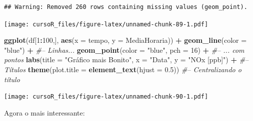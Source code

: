 \documentclass[]{book}
\newenvironment{Shaded}{\begin{snugshade}}{\end{snugshade}}
\newcommand{\KeywordTok}[1]{\textcolor[rgb]{0.13,0.29,0.53}{\textbf{#1}}}
\newcommand{\DataTypeTok}[1]{\textcolor[rgb]{0.13,0.29,0.53}{#1}}
\newcommand{\DecValTok}[1]{\textcolor[rgb]{0.00,0.00,0.81}{#1}}
\newcommand{\FloatTok}[1]{\textcolor[rgb]{0.00,0.00,0.81}{#1}}
\newcommand{\StringTok}[1]{\textcolor[rgb]{0.31,0.60,0.02}{#1}}
\newcommand{\CommentTok}[1]{\textcolor[rgb]{0.56,0.35,0.01}{\textit{#1}}}
\newcommand{\OperatorTok}[1]{\textcolor[rgb]{0.81,0.36,0.00}{\textbf{#1}}}
\newcommand{\NormalTok}[1]{#1}
\theoremstyle{definition}
\theoremstyle{definition}
\theoremstyle{definition}
\theoremstyle{remark}
\begin{document}
\begin{verbatim}
## Warning: Removed 260 rows containing missing values (geom_point).
\end{verbatim}

\texttt{[image: cursoR\_files/figure-latex/unnamed-chunk-89-1.pdf]}

\begin{Shaded}
\begin{Highlighting}[]
\KeywordTok{ggplot}\NormalTok{(df[}\DecValTok{1}\OperatorTok{:}\DecValTok{100}\NormalTok{,], }\KeywordTok{aes}\NormalTok{(}\DataTypeTok{x =}\NormalTok{ tempo, }\DataTypeTok{y =}\NormalTok{ MediaHoraria)) }\OperatorTok{+}\StringTok{ }
\StringTok{  }\KeywordTok{geom_line}\NormalTok{(}\DataTypeTok{color =} \StringTok{"blue"}\NormalTok{) }\OperatorTok{+}\StringTok{ }\CommentTok{#-- Linhas...}
\StringTok{  }\KeywordTok{geom_point}\NormalTok{(}\DataTypeTok{color =} \StringTok{"blue"}\NormalTok{, }\DataTypeTok{pch =} \DecValTok{16}\NormalTok{) }\OperatorTok{+}\StringTok{ }\CommentTok{#-- ... com pontos}
\StringTok{  }\KeywordTok{labs}\NormalTok{(}\DataTypeTok{title =} \StringTok{"Gráfico mais Bonito"}\NormalTok{, }\DataTypeTok{x =} \StringTok{"Data"}\NormalTok{, }\DataTypeTok{y =} \StringTok{"NOx [ppb]"}\NormalTok{) }\OperatorTok{+}\StringTok{ }\CommentTok{#-- Títulos}
\StringTok{  }\KeywordTok{theme}\NormalTok{(}\DataTypeTok{plot.title =} \KeywordTok{element_text}\NormalTok{(}\DataTypeTok{hjust =} \FloatTok{0.5}\NormalTok{)) }\CommentTok{#-- Centralizando o título}
\end{Highlighting}
\end{Shaded}

\texttt{[image: cursoR\_files/figure-latex/unnamed-chunk-90-1.pdf]}

Agora o mais interessante:
\end{document}
